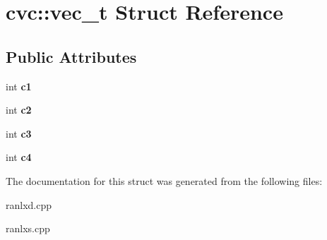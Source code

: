 \hypertarget{structcvc_1_1vec__t}{\section{cvc\-:\-:vec\-\_\-t Struct Reference}
\label{structcvc_1_1vec__t}
}
\subsection*{Public Attributes}
\begin{DoxyCompactItemize}
\item 
\hypertarget{structcvc_1_1vec__t_ac28e5336184d3682b2fd26a99cbc33c0}{int {\bfseries c1}}\label{structcvc_1_1vec__t_ac28e5336184d3682b2fd26a99cbc33c0}

\item 
\hypertarget{structcvc_1_1vec__t_ab3a0815092838b391818ea379956bf47}{int {\bfseries c2}}\label{structcvc_1_1vec__t_ab3a0815092838b391818ea379956bf47}

\item 
\hypertarget{structcvc_1_1vec__t_a03401119de4de21c3d22fddd54f57d63}{int {\bfseries c3}}\label{structcvc_1_1vec__t_a03401119de4de21c3d22fddd54f57d63}

\item 
\hypertarget{structcvc_1_1vec__t_a942f56cbb490f6abfee07ea81a98390d}{int {\bfseries c4}}\label{structcvc_1_1vec__t_a942f56cbb490f6abfee07ea81a98390d}

\end{DoxyCompactItemize}


The documentation for this struct was generated from the following files\-:\begin{DoxyCompactItemize}
\item 
ranlxd.\-cpp\item 
ranlxs.\-cpp\end{DoxyCompactItemize}
